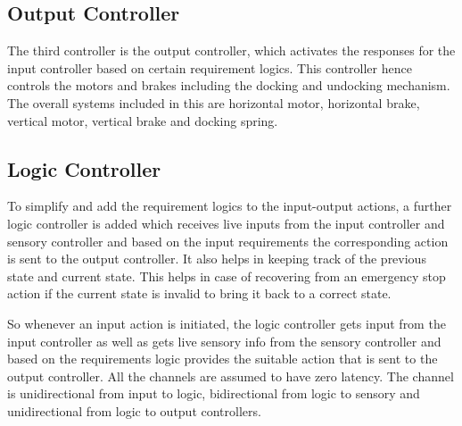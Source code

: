 \subsection{Output Controller}
The third controller is the output controller, which activates the responses for the input controller based on certain requirement logics. This controller hence controls the motors and brakes including the docking and undocking mechanism. The overall  systems included in this are horizontal motor, horizontal brake, vertical motor, vertical brake and docking spring.

\subsection{Logic Controller}
To simplify and add the requirement logics to the input-output actions, a further logic controller is added which receives live inputs from the input controller and sensory controller and based on the input requirements the corresponding action is sent to the output controller. It also helps in keeping track of the previous state and current state. This helps in case of recovering from an emergency stop action if the current state is invalid to bring it back to a correct state.

So whenever an input action is initiated, the logic controller gets input from the input controller as well as gets live sensory info from the sensory controller and based on the requirements logic provides the suitable action that is sent to the output controller. All the channels are assumed to have zero latency. The channel is unidirectional from input to logic, bidirectional from logic to sensory and unidirectional from logic to output controllers.
